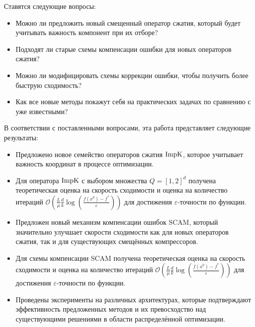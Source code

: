     Ставятся следующие вопросы:
    \begin{itemize}
        \item Можно ли предложить новый смещенный оператор сжатия, который будет учитывать важность компонент при их отборе?
        \item Подходят ли старые схемы компенсации ошибки для новых операторов сжатия?
        \item Можно ли модифицировать схемы коррекции ошибки, чтобы получить более быструю сходимость?
        \item Как все новые методы покажут себя на практических задачах по сравнению с уже известными?
    \end{itemize}
    В соответствии с поставленными вопросами, эта работа представляет следующие результаты:
    \begin{itemize}
        \item Предложено новое семейство операторов сжатия $\operatorname{ImpK}$, которое учитывает важность координат в процессе оптимизации.
        \item Для оператора $\operatorname{ImpK}$ с выбором множества $Q = [1, 2]^d$ получена теоретическая оценка на скорость сходимости и оценка на количество итераций $\mathcal{O}\left(\frac{L}{\mu} \frac{d}{k} \log\left(\frac{f(x^0) - f^*}{\varepsilon}\right)\right)$ для достижения $\varepsilon$-точности по функции.
        \item Предложен новый механизм компенсации ошибок SCAM, который значительно улучшает скорости сходимости как для новых операторов сжатия, так и для существующих смещённых компрессоров.
        \item Для схемы компенсации SCAM получена теоретическая оценка на скорость сходимости и оценка на количество итераций $\mathcal{O}\left(\frac{L}{\mu} \frac{d}{k} \log\left(\frac{f(x^0) - f^*}{\varepsilon}\right)\right)$ для достижения $\varepsilon$-точности по функции.
        \item Проведены эксперименты на различных архитектурах, которые подтверждают эффективность предложенных методов и их превосходство над существующими решениями в области распределённой оптимизации.
    \end{itemize}